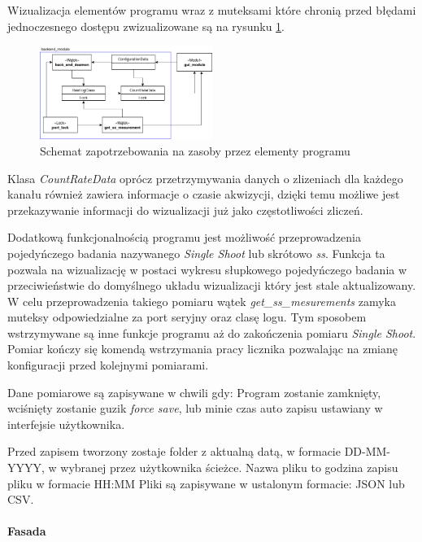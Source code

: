 \documentclass[a4paper,12pt]{article}
\begin{document}
Wizualizacja elementów programu wraz z muteksami które chronią przed błędami jednoczesnego dostępu zwizualizowane są na rysunku \ref{program zapotrzebowanie}.

\begin{figure}
        \centering
        \includegraphics[width=0.5\textwidth]{Schemat_zapotrzebowania.png}
        \caption{Schemat zapotrzebowania na zasoby przez elementy programu}
        \label{program zapotrzebowanie}
\end{figure}

Klasa \textit{CountRateData} oprócz przetrzymywania danych o zlizeniach dla każdego kanału również zawiera informacje o czasie akwizycji, dzięki temu możliwe jest przekazywanie informacji do wizualizacji już jako częstotliwości zliczeń. 

Dodatkową funkcjonalnością programu jest możliwość przeprowadzenia pojedyńczego badania nazywanego \textit{Single Shoot} lub skrótowo \textit{ss}.
Funkcja ta pozwala na wizualizację w postaci wykresu słupkowego pojedyńczego badania w przeciwieństwie do domyślnego układu wizualizacji który jest stale aktualizowany. 
W celu przeprowadzenia takiego pomiaru wątek \textit{get\_ss\_mesurements} zamyka muteksy odpowiedzialne za port seryjny oraz clasę logu. 
Tym sposobem wstrzymywane są inne funkcje programu aż do zakończenia pomiaru \textit{Single Shoot}.
Pomiar kończy się komendą wstrzymania pracy licznika pozwalając na zmianę konfiguracji przed kolejnymi pomiarami.  

Dane pomiarowe są zapisywane w chwili gdy: Program zostanie zamknięty, wciśnięty zostanie guzik \textit{force save}, lub minie czas auto zapisu ustawiany w interfejsie użytkownika. 

Przed zapisem tworzony zostaje folder z aktualną datą, w formacie DD-MM-YYYY, w wybranej przez użytkownika ścieżce. Nazwa pliku to godzina zapisu pliku w formacie HH:MM
Pliki są zapisywane w ustalonym formacie: JSON lub CSV.

\paragraph{Fasada}
\end{document}
